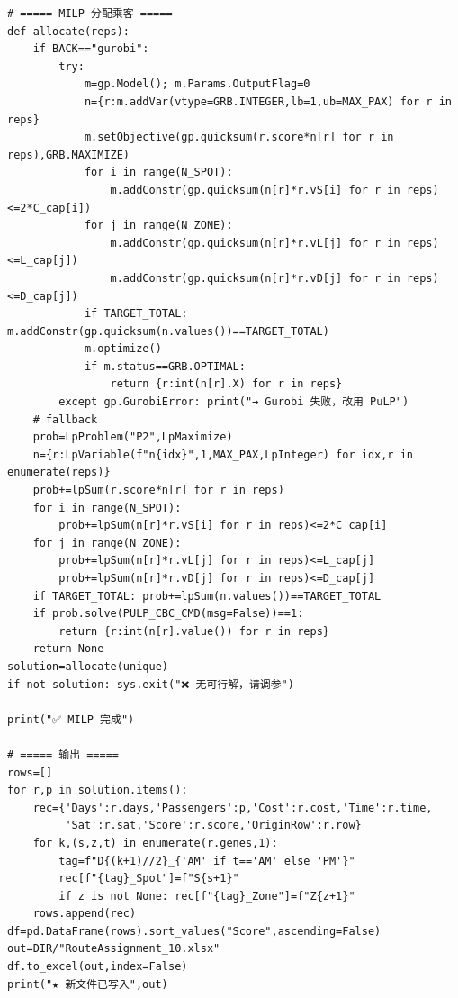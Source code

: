 \documentclass[12pt,a4paper]{article}
\begin{document}
\begin{lstlisting}
# ===== MILP 分配乘客 =====
def allocate(reps):
    if BACK=="gurobi":
        try:
            m=gp.Model(); m.Params.OutputFlag=0
            n={r:m.addVar(vtype=GRB.INTEGER,lb=1,ub=MAX_PAX) for r in reps}
            m.setObjective(gp.quicksum(r.score*n[r] for r in reps),GRB.MAXIMIZE)
            for i in range(N_SPOT):
                m.addConstr(gp.quicksum(n[r]*r.vS[i] for r in reps)<=2*C_cap[i])
            for j in range(N_ZONE):
                m.addConstr(gp.quicksum(n[r]*r.vL[j] for r in reps)<=L_cap[j])
                m.addConstr(gp.quicksum(n[r]*r.vD[j] for r in reps)<=D_cap[j])
            if TARGET_TOTAL: m.addConstr(gp.quicksum(n.values())==TARGET_TOTAL)
            m.optimize()
            if m.status==GRB.OPTIMAL:
                return {r:int(n[r].X) for r in reps}
        except gp.GurobiError: print("→ Gurobi 失败，改用 PuLP")
    # fallback
    prob=LpProblem("P2",LpMaximize)
    n={r:LpVariable(f"n{idx}",1,MAX_PAX,LpInteger) for idx,r in enumerate(reps)}
    prob+=lpSum(r.score*n[r] for r in reps)
    for i in range(N_SPOT):
        prob+=lpSum(n[r]*r.vS[i] for r in reps)<=2*C_cap[i]
    for j in range(N_ZONE):
        prob+=lpSum(n[r]*r.vL[j] for r in reps)<=L_cap[j]
        prob+=lpSum(n[r]*r.vD[j] for r in reps)<=D_cap[j]
    if TARGET_TOTAL: prob+=lpSum(n.values())==TARGET_TOTAL
    if prob.solve(PULP_CBC_CMD(msg=False))==1:
        return {r:int(n[r].value()) for r in reps}
    return None
solution=allocate(unique)
if not solution: sys.exit("❌ 无可行解，请调参")

print("✅ MILP 完成")

# ===== 输出 =====
rows=[]
for r,p in solution.items():
    rec={'Days':r.days,'Passengers':p,'Cost':r.cost,'Time':r.time,
         'Sat':r.sat,'Score':r.score,'OriginRow':r.row}
    for k,(s,z,t) in enumerate(r.genes,1):
        tag=f"D{(k+1)//2}_{'AM' if t=='AM' else 'PM'}"
        rec[f"{tag}_Spot"]=f"S{s+1}"
        if z is not None: rec[f"{tag}_Zone"]=f"Z{z+1}"
    rows.append(rec)
df=pd.DataFrame(rows).sort_values("Score",ascending=False)
out=DIR/"RouteAssignment_10.xlsx"
df.to_excel(out,index=False)
print("★ 新文件已写入",out)
\end{lstlisting}
\end{document}
